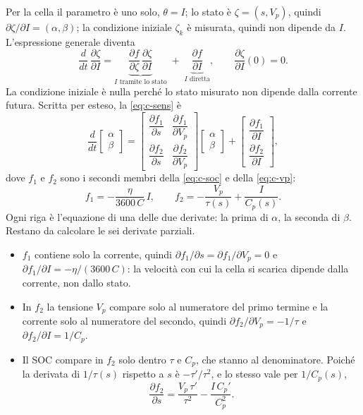 \documentclass[11pt,a4paper]{article}
\begin{document}
Per la cella il parametro è uno solo, $\theta = I$; lo stato è $\zeta = (s, V_p)$,
quindi $\partial \zeta/\partial I = (\alpha, \beta)$; la condizione iniziale $\zeta_k$
è misurata, quindi non dipende da $I$. L'espressione generale diventa
\begin{equation}
  \frac{d}{dt}\,\frac{\partial \zeta}{\partial I}
    = \underbrace{\frac{\partial f}{\partial \zeta}\,
                  \frac{\partial \zeta}{\partial I}}_{I \text{ tramite lo stato}}
    \;+\; \underbrace{\frac{\partial f}{\partial I}}_{I \text{ diretta}} ,
  \qquad \frac{\partial \zeta}{\partial I}(0) = 0 .
  \tag{C5}\label{eq:c-sens}
\end{equation}
La condizione iniziale è nulla perché lo stato misurato non dipende dalla
corrente futura. Scritta per esteso, la \eqref{eq:c-sens} è
\[
  \frac{d}{dt}
  \begin{bmatrix} \alpha \\[4pt] \beta \end{bmatrix}
  =
  \begin{bmatrix}
    \dfrac{\partial f_1}{\partial s} & \dfrac{\partial f_1}{\partial V_p} \\[10pt]
    \dfrac{\partial f_2}{\partial s} & \dfrac{\partial f_2}{\partial V_p}
  \end{bmatrix}
  \begin{bmatrix} \alpha \\[4pt] \beta \end{bmatrix}
  +
  \begin{bmatrix}
    \dfrac{\partial f_1}{\partial I} \\[10pt] \dfrac{\partial f_2}{\partial I}
  \end{bmatrix},
\]
dove $f_1$ e $f_2$ sono i secondi membri della \eqref{eq:c-soc} e della
\eqref{eq:c-vp}:
\[
  f_1 = -\frac{\eta}{3600\,C}\, I , \qquad
  f_2 = -\frac{V_p}{\tau(s)} + \frac{I}{C_p(s)} .
\]
Ogni riga è l'equazione di una delle due derivate: la prima di $\alpha$, la
seconda di $\beta$. Restano da calcolare le sei derivate parziali.
\begin{itemize}
  \item $f_1$ contiene solo la corrente, quindi
        $\partial f_1/\partial s = \partial f_1/\partial V_p = 0$ e
        $\partial f_1/\partial I = -\eta/(3600\,C)$: la velocità con cui la
        cella si scarica dipende dalla corrente, non dallo stato.
  \item In $f_2$ la tensione $V_p$ compare solo al numeratore del primo
        termine e la corrente solo al numeratore del secondo, quindi
        $\partial f_2/\partial V_p = -1/\tau$ e
        $\partial f_2/\partial I = 1/C_p$.
  \item Il SOC compare in $f_2$ solo dentro $\tau$ e $C_p$, che stanno al
        denominatore. Poiché la derivata di $1/\tau(s)$ rispetto a $s$ è
        $-\tau'/\tau^2$, e lo stesso vale per $1/C_p(s)$,
        \[
          \frac{\partial f_2}{\partial s}
            = \frac{V_p\,\tau'}{\tau^2} - \frac{I\,C_p'}{C_p^2} .
        \]
\end{itemize}
\end{document}

